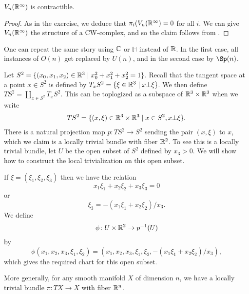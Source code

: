 \documentclass[ma3408.tex]{subfiles}
\begin{document}
\begin{Prop}
$V_n(\mathbb{R}^{\infty})$ is contractible.
\end{Prop}
\begin{proof}
	As in the exercise, we deduce that $\pi_i(V_n(\mathbb{R}^{\infty}) = 0$ for all $i$. We can give $V_n(\mathbb{R}^{\infty})$ the structure of a CW-complex, and so the claim follows from . 
\end{proof}
\begin{Rem}
One can repeat the same story using $\mathbb{C}$ or $\mathbb{H}$ instead of $\mathbb{R}$. In the first case, all instances of $O(n)$ get replaced by $U(n)$, and in the second case by $\Sp(n)$. 
\end{Rem}
\begin{Exa}\label{exa:ts2}
Let $S^2 = \{ (x_0,x_1,x_2) \in \mathbb{R}^3 \mid x_0^2+x_1^2+x_2^2 = 1\}$. Recall that the tangent space at a point $x \in S^2$ is defined by $T_xS^2 = \{\xi \in \mathbb{R}^3 \mid x \bot \xi \}$. We then define $TS^2 = \coprod_{x \in S^2}T_xS^2$. This can be toplogized as a subspace of $\mathbb{R}^3 \times \mathbb{R}^3$ when we write
\[
TS^2 = \{ (x,\xi) \in \mathbb{R}^3 \times \mathbb{R}^3 \mid x \in S^2, x \bot \xi \}.
\]
There is a natural projection map $p \colon TS^2 \to S^2$ sending the pair $(x,\xi)$ to $x$, which we claim is a locally trivial bundle with fiber $\mathbb{R}^2$.  To see this is a locally trivial bundle, let $U$ be the open subset of $S^2$ defined by $x_3>0$. We will show how to construct the local trivialization on this open subset. 

If $\xi = (\xi_1,\xi_2,\xi_3)$ then we have the relation
\[
x_1\xi_1 + x_2\xi_2 + x_3\xi_3 = 0
\]
or 
\[
\xi_3 = -(x_1\xi_1 + x_2\xi_2)/x_3.
\]
We define
\[
\phi \colon U \times \mathbb{R}^2 \to p^{-1}(U)
\]
by
\[
\phi(x_1,x_2,x_3,\xi_1,\xi_2) = (x_1,x_2,x_3,\xi_1,\xi_2,-(x_1\xi_1 + x_2\xi_2)/x_3),
\]
which gives the required chart for this open subset. 
\end{Exa}
\begin{Rem}
More generally, for any smooth manifold $X$ of dimension  $n$, we have a locally trivial bundle $\pi \colon TX \to X$ with fiber $\mathbb{R}^n$. 
\end{Rem}
\end{document}

